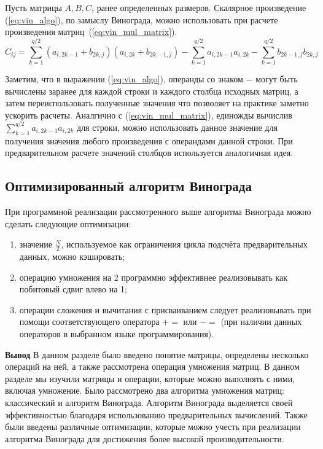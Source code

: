 Пусть матрицы $A, B, C$, ранее определенных размеров. Скалярное произведение (\ref{eq:vin_algo}), по замыслу Винограда, можно использовать при расчете 
произведения матриц~(\ref{eq:vin_mul_matrix}).
\begin{equation} 
	\label{eq:vin_mul_matrix}
	C_{ij} = \sum_{k=1}^{q/2}(a_{i,2k-1} + b_{2k,j})(a_{i,2k} + b_{2k-1,j}) - \sum_{k=1}^{q/2} a_{i,2k-1}a_{i,2k} - \sum_{k=1}^{q/2} b_{2k-1,j}b_{2k,j}
\end{equation}


Заметим, что в выражении (\ref{eq:vin_algo}), операнды со знаком $-$ могут быть вычислены заранее для каждой
строки и каждого столбца исходных матриц, а затем переиспользовать полученные значения что позволяет на практике заметно ускорить расчеты.
Аналгично с (\ref{eq:vin_mul_matrix}), единожды вычислив $\sum_{k=1}^{q/2}a_{i,2k-1}a_{i,2k}$ для строки, можно использовать данное
значение для получения значения любого произведения с операндами данной строки. При  предварительном расчете 
значений столбцов используется аналогичная идея.



\subsection{Оптимизированный алгоритм Винограда}

При программной реализации рассмотренного выше алгоритма Винограда можно сделать следующие оптимизации:
\begin{enumerate}
	\item значение $\frac{N}{2}$, используемое как ограничения цикла подсчёта предварительных данных, можно кэшировать;
	\item операцию умножения на 2 программно эффективнее реализовывать как побитовый сдвиг влево на 1;
	\item операции сложения и вычитания с присваиванием следует реализовывать при помощи соответствующего оператора $+=$ или $-=$ (при наличии данных операторов в выбранном языке программирования).
\end{enumerate}

\textbf{Вывод}
В данном разделе было введено понятие матрицы, определены несколько операций на ней, 
а также рассмотрена операция умножения матриц.
В данном разделе мы изучили матрицы и операции, 
которые можно выполнять с ними, включая умножение. 
Было рассмотрено  два алгоритма умножения матриц: классический и алгоритм Винограда.
Алгоритм Винограда выделяется своей эффективностью благодаря использованию предварительных вычислений. 
Также были введены  различные оптимизации, которые можно учесть при реализации алгоритма Винограда для 
достижения более высокой производительности.